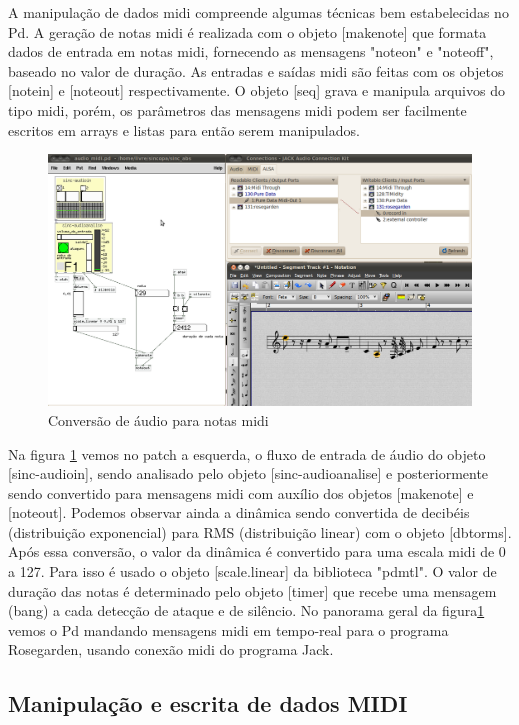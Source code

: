 \documentclass[draft]{ppgmus}
\begin{document}
A manipulação de dados midi compreende algumas técnicas bem estabelecidas
no Pd. A geração de notas midi é realizada com o objeto [makenote] que formata
dados de entrada em notas midi, fornecendo as mensagens "noteon" e "noteoff", baseado
no valor de duração. As entradas e saídas midi são feitas com os objetos
[notein] e [noteout] respectivamente. O objeto [seq] grava e manipula arquivos 
do tipo midi, porém, os parâmetros das mensagens midi podem ser facilmente escritos
em arrays e listas para então serem manipulados.

\begin{figure}
\includegraphics[scale=.37]{audio2midi}
\caption{Conversão de áudio para notas midi}
\label{audio2midi}
\end{figure}


Na figura \ref{audio2midi} vemos no patch a esquerda, o fluxo de entrada de áudio do objeto
[sinc-audioin], sendo analisado pelo objeto [sinc-audioanalise] e posteriormente
sendo convertido para mensagens midi com auxílio dos objetos [makenote] e [noteout].
Podemos observar ainda a dinâmica sendo convertida de decibéis (distribuição exponencial)
 para RMS (distribuição linear) com o objeto [dbtorms]. Após essa conversão,
o valor da dinâmica é convertido para uma escala midi de 0 a 127. Para isso é usado
o objeto [scale.linear] da biblioteca "pdmtl". O valor de duração das notas é determinado
pelo objeto [timer] que recebe uma mensagem (bang) a cada detecção de ataque e de silêncio.
No panorama geral da figura\ref{audio2midi} vemos o Pd mandando mensagens midi em tempo-real
para o programa Rosegarden, usando conexão midi do programa Jack. 



\subsection{Manipulação e escrita de dados MIDI}
\end{document}
